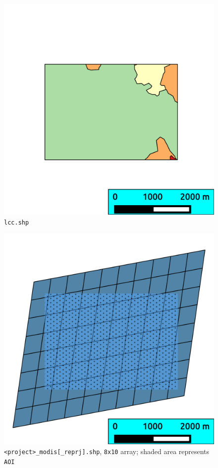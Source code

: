 \documentclass[twoside,a4paper]{refart}
\begin{document}
\begin{figure}
\includegraphics{thumbs/aoi}
\caption{\texttt{lcc.shp}}
\end{figure}

\begin{figure}
\includegraphics{thumbs/modis}
\caption{\texttt{<project>\_modis[\_reprj].shp}, \texttt{8x10} array; shaded area represents \texttt{AOI}}
\end{figure}
\end{document}
